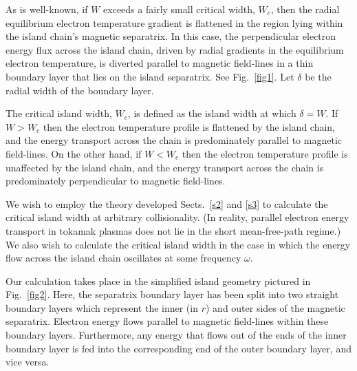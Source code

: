 \documentclass[12pt,prb,aps]{revtex4-1}
\begin{document}
As is well-known, if $W$ exceeds a fairly small critical width, $W_c$, then the radial equilibrium electron temperature
gradient is flattened in the region lying within the island chain's magnetic separatrix.\cite{rf} In this case, the perpendicular electron energy flux across the island chain, driven by radial gradients in the equilibrium electron temperature, is diverted   parallel to magnetic field-lines
in a thin boundary layer that lies on the island separatrix. See Fig.~\ref{fig1}. Let $\delta$ be the radial width of the boundary layer.

 The critical island width, $W_c$, is defined as the island width at which $\delta = W$. If
$W>W_c$ then the electron temperature profile is flattened by the island chain, and the energy transport across the chain is predominately parallel to magnetic field-lines. On the other hand,  if $W<W_c$ then the electron temperature profile is unaffected by the island chain, and the energy transport across the chain is predominately perpendicular to magnetic field-lines.\cite{rf} 

We wish to employ the theory developed Sects.~\ref{s2} and \ref{s3} to calculate the critical
island width at arbitrary collisionality. (In reality, parallel electron energy transport in tokamak plasmas does not lie in the short mean-free-path regime.) We also wish to calculate the critical island width in the case
in which the energy flow across the island chain oscillates at some frequency $\omega$. 

Our calculation takes place in the simplified island geometry pictured in Fig.~\ref{fig2}. Here, the separatrix boundary layer has been split into two straight boundary layers which represent the inner
(in $r$) and outer sides of the magnetic separatrix.  Electron energy flows parallel to magnetic field-lines within these boundary layers. Furthermore, any energy that flows out of the ends of the inner boundary layer is
fed into the corresponding end of the outer boundary layer, and vice versa. 
\end{document}
